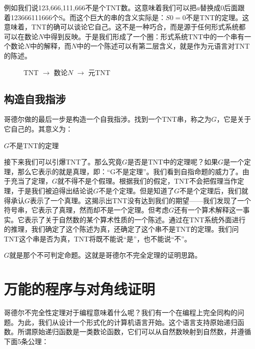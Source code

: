 \documentclass{article}
\begin{document}
例如我们说123,666,111,666不是个TNT数。这意味着我们可以把$a$替换成0后面跟着123666111666个S。而这个巨大的串的含义实际是：$S0 = 0$不是TNT的定理。这意味着，TNT的确可以谈论它自己。这不是一种巧合，而是源于任何形式系统都可以在数论$N$中得到反映。于是我们形成了一个圈：形式系统TNT中的一个串有一个数论$N$中的解释，而$N$中的一个陈述可以有第二层含义，就是作为元语言对TNT的陈述。

\begin{figure}[htbp]
\centering
{}
\caption{TNT $\to$ 数论$N$ $\to$ 元TNT}
\label{fig:TNT-N-TNT}
\end{figure}

\subsection{构造自我指涉}

哥德尔做的最后一步是构造一个自我指涉。找到一个TNT串，称之为$G$，它是关于它自己的。其意义为：

\begin{center}
$G$不是TNT的定理
\end{center}

接下来我们可以引爆TNT了。那么究竟$G$是否是TNT中的定理呢？如果$G$是一个定理，那么它表示的就是真理，即：“G不是定理”。我们看到自指命题的威力了。由于充当了定理，$G$就不得不是个假理。根据我们的假定，TNT不会把假理当作定理，于是我们被迫得出结论说$G$不是个定理。但是知道了$G$不是个定理后，我们就得承认$G$表示了一个真理。这揭示出TNT没有达到我们的期望——我们发现了一个符号串，它表示了真理，然而却不是一个定理。但考虑$G$还有一个算术解释这一事实。它表示了关于自然数的某个算术性质的一个陈述。通过在TNT系统外面进行的推理，我们确定了这个陈述为真，还确定了这个串不是TNT的定理。我们问TNT这个串是否为真，TNT将既不能说“是”，也不能说“不”。

$G$就是那个不可判定命题。这就是哥德尔不完全定理的证明思路。

\section{万能的程序与对角线证明}
哥德尔不完全性定理对于编程意味着什么呢？我们有一个在编程上完全同构的问题。为此，我们从设计一个形式化的计算机语言开始。这个语言支持原始递归函数。所谓原始递归函数是一类数论函数，它们可以从自然数映射到自然数，并遵循下面5条公理：
\end{document}
